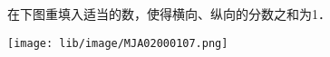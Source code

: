 在下图重填入适当的数，使得横向、纵向的分数之和为1．\\
\begin{center}
	\texttt{[image: lib/image/MJA02000107.png]}
	\vspace{0.5cm}
\end{center}